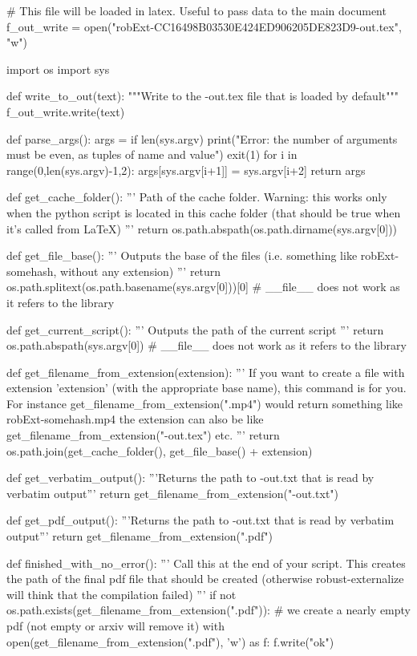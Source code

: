 
# This file will be loaded in latex. Useful to pass data to the main document
f_out_write = open("robExt-CC16498B03530E424ED906205DE823D9-out.tex", "w")

import os
import sys

def write_to_out(text):
    """Write to the -out.tex file that is loaded by default"""
    f_out_write.write(text)

def parse_args():
    args = {}
    if len(sys.argv) %
        print("Error: the number of arguments must be even, as tuples of name and value")
        exit(1)
    for i in range(0,len(sys.argv)-1,2):
        args[sys.argv[i+1]] = sys.argv[i+2]
    return args

def get_cache_folder():
    '''
    Path of the cache folder. Warning: this works only when the python script
    is located in this cache folder (that should be true when it's called from LaTeX)
    '''
    return os.path.abspath(os.path.dirname(sys.argv[0]))

def get_file_base():
    '''
    Outputs the base of the files (i.e. something like robExt-somehash, without any extension)
    '''
    return os.path.splitext(os.path.basename(sys.argv[0]))[0] # __file__ does not work as it refers to the library

def get_current_script():
    '''
    Outputs the path of the current script
    '''
    return os.path.abspath(sys.argv[0]) # __file__ does not work as it refers to the library


def get_filename_from_extension(extension):
    '''
    If you want to create a file with extension 'extension' (with the appropriate base name), this command
    is for you. For instance get_filename_from_extension(".mp4") would return something like
    robExt-somehash.mp4
    the extension can also be like get_filename_from_extension("-out.tex") etc.
    '''
    return os.path.join(get_cache_folder(), get_file_base() + extension)

def get_verbatim_output():
    '''Returns the path to -out.txt that is read by verbatim output'''
    return get_filename_from_extension("-out.txt")

def get_pdf_output():
    '''Returns the path to -out.txt that is read by verbatim output'''
    return get_filename_from_extension(".pdf")


def finished_with_no_error():
    '''
    Call this at the end of your script. This creates the path of the final pdf file that should be
    created (otherwise robust-externalize will think that the compilation failed)
    '''
    if not os.path.exists(get_filename_from_extension(".pdf")):
        # we create a nearly empty pdf (not empty or arxiv will remove it)
        with open(get_filename_from_extension(".pdf"), 'w') as f:
            f.write("ok")

